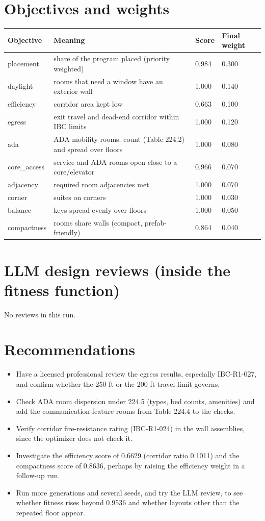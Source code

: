 \documentclass[10pt]{article}
\begin{document}
\section{Objectives and weights}
{\small\begin{longtable}{p{2.4cm}p{8.2cm}p{1.6cm}p{2cm}}\toprule
\textbf{Objective} & \textbf{Meaning} & \textbf{Score} & \textbf{Final weight} \\ \midrule \endhead
placement & share of the program placed (priority weighted) & 0.984 & 0.300 \\
daylight & rooms that need a window have an exterior wall & 1.000 & 0.140 \\
efficiency & corridor area kept low & 0.663 & 0.100 \\
egress & exit travel and dead-end corridor within IBC limits & 1.000 & 0.120 \\
ada & ADA mobility rooms: count (Table 224.2) and spread over floors & 1.000 & 0.080 \\
core\_access & service and ADA rooms open close to a core/elevator & 0.966 & 0.070 \\
adjacency & required room adjacencies met & 1.000 & 0.070 \\
corner & suites on corners & 1.000 & 0.030 \\
balance & keys spread evenly over floors & 1.000 & 0.050 \\
compactness & rooms share walls (compact, prefab-friendly) & 0.864 & 0.040 \\
\bottomrule\end{longtable}}

\section{LLM design reviews (inside the fitness function)}
No reviews in this run.

\section{Recommendations}
\begin{itemize}
\item Have a licensed professional review the egress results, especially IBC-R1-027, and confirm whether the 250 ft or the 200 ft travel limit governs.
\item Check ADA room dispersion under 224.5 (types, bed counts, amenities) and add the communication-feature rooms from Table 224.4 to the checks.
\item Verify corridor fire-resistance rating (IBC-R1-024) in the wall assemblies, since the optimizer does not check it.
\item Investigate the efficiency score of 0.6629 (corridor ratio 0.1011) and the compactness score of 0.8636, perhaps by raising the efficiency weight in a follow-up run.
\item Run more generations and several seeds, and try the LLM review, to see whether fitness rises beyond 0.9536 and whether layouts other than the repeated floor appear.
\end{itemize}
\end{document}
